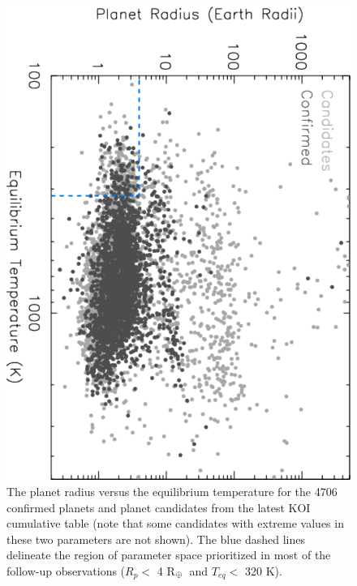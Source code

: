 \documentclass[twocolumn,appendixfloats]{aastex6}
\newcommand{\RE}{R$_{\Earth}$}
\begin{document}
\begin{figure}[!t]
\centering
\includegraphics[angle=90, scale=0.39]{KOI_planets_Rp_Teq.pdf}
\caption{The planet radius versus the equilibrium temperature for the 4706
confirmed planets and planet candidates from the latest KOI cumulative
table (note that some candidates with extreme values in these two 
parameters are not shown). The blue dashed lines delineate the region 
of parameter space prioritized in most of the follow-up observations 
($R_p < $ 4 \RE\ and $T_{eq} <$ 320 K). \label{KOIs_Rp_Teq}}
\end{figure}
\end{document}

